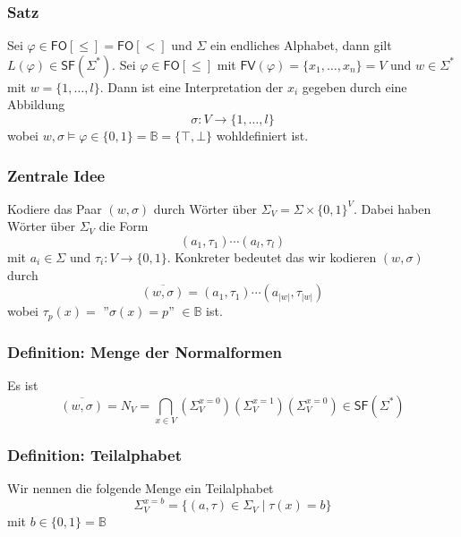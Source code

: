 \documentclass[12pt, german]{article}
\newcommand{\B}{\mathbb{B}}
\newcommand{\sigstern}{\Sigma^\ast}
\newcommand{\starfree}{\mathsf{SF}}
\newcommand{\fv}{\mathsf{FV}}
\newcommand{\fo}{\mathsf{FO}}
\begin{document}
\subsubsection{Satz}
	Sei $\varphi \in \fo[\leq] = \fo[<]$ und $\Sigma$ ein endliches Alphabet, dann gilt $L(\varphi) \in \starfree(\sigstern)$. Sei $\varphi \in \fo[\leq]$ mit $\fv(\varphi) = \{x_1, \ldots, x_n\} = V$ und $w \in \sigstern$ mit $w = \{1, \ldots, l\}$. Dann ist eine Interpretation der $x_i$ gegeben durch eine Abbildung $$\sigma: V \to \{1, \ldots,l\}$$ wobei $w, \sigma \models \varphi \in \{0,1\} = \B = \{\top, \bot\}$ wohldefiniert ist. 

\subsubsection{Zentrale Idee}
	Kodiere das Paar $(w, \sigma)$ durch Wörter über $\Sigma_V = \Sigma \times \{0,1\}^V$. Dabei haben Wörter über $\Sigma_V$ die Form $$(a_1, \tau_1) \cdots (a_l, \tau_l)$$ mit $a_i \in \Sigma$ und $\tau_i : V \to \{0,1\}$. Konkreter bedeutet das wir kodieren $(w, \sigma)$ durch $$\overline{(w, \sigma)} = (a_1, \tau_1) \cdots (a_{|w|}, \tau_{|w|})$$ wobei $\tau_p(x) =$ ''$\sigma(x) = p$'' $\in \B$ ist. 

\subsubsection{Definition: Menge der Normalformen}
	Es ist $$\overline{(w, \sigma)} = N_V = \bigcap_{x \in V} (\Sigma_V^{x=0})(\Sigma_V^{x=1})(\Sigma_V^{x=0}) \in \starfree(\sigstern)$$

\subsubsection{Definition: Teilalphabet}
	Wir nennen die folgende Menge ein Teilalphabet $$\Sigma_V^{x=b} = \{(a, \tau) \in \Sigma_V \mid \tau(x) = b\}$$ mit $b \in \{0,1\} = \B$
\end{document}
